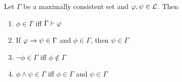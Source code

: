 \begin{lemma}
\label{exp_lemma_mcs_facts}
    Let $\Gamma$ be a maximally consistent set and $\varphi, \psi \in \mathcal{L}$. Then
    \begin{enumerate}
        \item\label{exp_item_mcs_mem_entail} $\phi \in \Gamma$ iff $\Gamma \vdash
            \varphi$

        \item\label{exp_item_mcs_modpon} If $\varphi \rightarrow \psi \in \Gamma$ and
            $\phi \in \Gamma$, then $\psi \in \Gamma$

        \item\label{exp_item_mcs_negations} $\neg\phi \in \Gamma$ iff $\phi \notin
            \Gamma$

        \item\label{exp_item_mcs_conjunctions} $\phi \land \psi \in \Gamma$ iff
            $\phi \in \Gamma$ and $\psi \in \Gamma$
    \end{enumerate}
\end{lemma}

